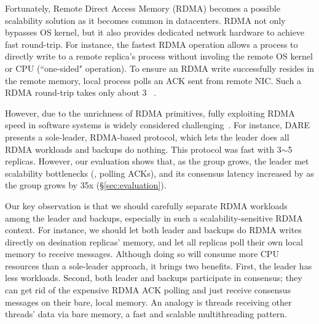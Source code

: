 Fortunately, Remote Direct Access Memory (RDMA) becomes a possible scalability 
solution as it becomes common in datacenters. RDMA not only bypasses OS 
kernel, but it also provides dedicated network hardware to achieve fast 
round-trip. For instance, the fastest RDMA operation allows a process to 
directly write to a remote replica's process without involing the remote OS 
kernel or CPU (``one-sided" operation). To ensure an RDMA write successfully 
resides in the remote memory, local process polls an ACK sent from remote NIC. 
Such a RDMA round-trip takes only about 3 \us~\cite{pilaf:usenix14}.


However, due to the unrichness of RDMA primitives, fully exploiting RDMA
speed in software systems is widely
considered challenging~\cite{pilaf:usenix14,herd:sigcomm14,
farm:sosp15,dare:hpdc15}. For instance, DARE~\cite{dare:hpdc15} presents a
sole-leader, RDMA-based \paxos protocol, which lets the leader does all
RDMA workloads and backups do nothing. This protocol was fast with 3$\sim$5 
replicas. However, our evaluation shows that, as the group grows, the 
leader met scalability bottlenecks (\eg, polling ACKs), and its consensus 
latency increased by \darescalability as the group grows by 35x
(\S\ref{sec:evaluation}).



Our key observation is that we should carefully separate RDMA workloads among
the leader and backups, especially in such a scalability-sensitive RDMA 
context. For instance, we should let both leader and backups
do RDMA writes directly on desination replicas' memory, and let all
replicas poll their own local memory to receive messages. Although doing 
so will consume more CPU resources than a sole-leader approach, it brings two 
benefits. First, the leader has less workloads. Second, both leader and 
backups participate in consensus; they can get rid of the expensive RDMA ACK 
polling and just receive consensus messages on their bare, local memory. An 
analogy is threads receiving other threads' data via bare memory, a fast 
and scalable multithreading pattern.


